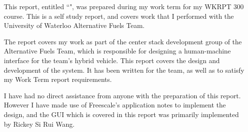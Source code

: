 \documentclass[ece]{uw-wkrpt}
\begin{document}
\begin{letter}
This report, entitled ``\thetitle", was prepared during my \theterm{} work term
for my WKRPT 300 course. This is a self study report, and covers work that I
performed with the University of Waterloo Alternative Fuels Team.

The report covers my work as part of the center stack development group of the
Alternative Fuels Team, which is responsible for designing a human-machine
interface for the team's hybrid vehicle. This report covers the design and
development of the system. It has been written for the team, as well as
to satisfy my Work Term report requirements.

I have had no direct assistance from anyone with the preparation of this report. 
However I have made use of Freescale's application notes to implement the
design, and the GUI which is covered in this report was primarily
implemented by Rickey Si Rui Wang.

\end{letter}
\end{document}

